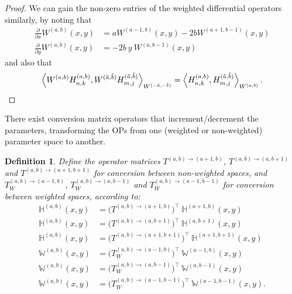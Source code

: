 \documentclass[11pt, oneside]{article}   	%
\newcommand{\pddx}{\frac{\partial}{\partial x}}
\newcommand{\pddy}{\frac{\partial}{\partial y}}
\newcommand{\hdop}{H}
\newcommand{\bighdop}{\mathbb{\hdop}}
\newcommand{\hdopnkab}{\hdop_{n,k}^{(a,b)}}
\newcommand{\Wab}{{W^{(a,b)}}}
\newcommand{\hdopmj}{\hdop_{m,j}}
\newcommand{\bigW}{\mathbb{W}}
\newtheorem{definition}{Definition}
\begin{document}
\begin{proof}
We can gain the non-zero entries of the weighted differential operators similarly, by noting that
\begin{align}
	\pddx \Wab(x,y) &= a W^{(a-1, b)}(x,y) - 2bW^{(a+1, b-1)}(x,y) \label{eqn:weightderivativex} \\
	\pddy \Wab(x,y) &= -2b \: y \: W^{(a, b-1)}(x,y) \label{eqn:weightderivativey}
\end{align}
and also that
\begin{align*}
	\ip< \Wab \hdopnkab, W^{(\tilde{a},\tilde{b})} \hdopmj^{(\tilde{a},\tilde{b})} >_{W^{(-\tilde{a},-\tilde{b})}} = \ip< \hdopnkab, \hdopmj^{(\tilde{a},\tilde{b})} >_\Wab.
\end{align*}

\end{proof}

There exist conversion matrix operators that increment/decrement the parameters, transforming the OPs from one (weighted or non-weighted) parameter space to another. 

\begin{definition}\label{def:parametertransformationoperators}
Define the operator matrices $T^{(a,b)\to(a+1,b)}$, $T^{(a,b)\to(a,b+1)}$ and $T^{(a,b)\to(a+1,b+1)}$ for conversion between non-weighted spaces, and $T_W^{(a,b)\to(a-1,b)}$, $T_W^{(a,b)\to(a,b-1)}$ and $T_W^{(a,b)\to(a-1,b-1)}$ for conversion between weighted spaces, according to:
\begin{align*}
	\bighdop^{(a,b)}(x,y) &= \Big(T^{(a,b)\to(a+1,b)} \Big)^\top \: \bighdop^{(a+1,b)}(x,y) \\
	\bighdop^{(a,b)}(x,y) &= \Big(T^{(a,b)\to(a,b+1)} \Big)^\top \: \bighdop^{(a,b+1)}(x,y) \\
	\bighdop^{(a,b)}(x,y) &= \Big(T^{(a,b)\to(a+1,b+1)} \Big)^\top \: \bighdop^{(a+1,b+1)}(x,y) \\
	\bigW^{(a,b)}(x,y) &= \Big(T_W^{(a,b)\to(a-1,b)} \Big)^\top \: \bigW^{(a-1,b)}(x,y) \\
	\bigW^{(a,b)}(x,y) &= \Big(T_W^{(a,b)\to(a,b-1)} \Big)^\top \: \bigW^{(a,b-1)}(x,y) \\
	\bigW^{(a,b)}(x,y) &= \Big(T_W^{(a,b)\to(a-1,b-1)} \Big)^\top \: \bigW^{(a-1,b-1)}(x,y).
\end{align*}
\end{definition}
\end{document}
